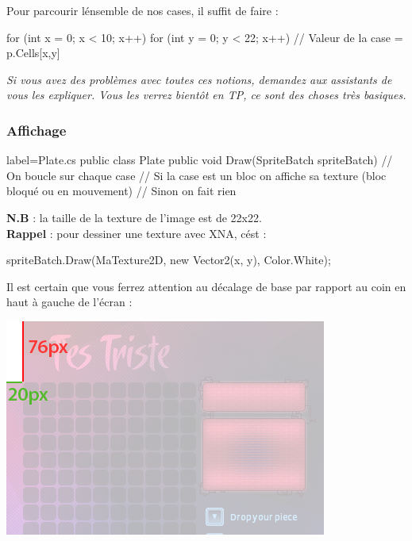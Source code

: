 \documentclass[a4paper]{article}
\begin{document}
\vspace{0.2cm}

Pour parcourir lénsemble de nos cases, il suffit de faire : \\

\begin{csharpcode}
for (int x = 0; x < 10; x++)
{
    for (int y = 0; y < 22; x++)
    {
        // Valeur de la case =  p.Cells[x,y]
    }
}
\end{csharpcode}

\vspace{0.2cm}

\noindent\emph{\color{toogyblue} Si vous avez des problèmes avec toutes ces notions,
demandez aux assistants de vous les expliquer. Vous les verrez bientôt en TP,
ce sont des choses très basiques.} \\

\subsubsection{Affichage}

\begin{csharpcode*}{label=Plate.cs}
public class Plate
{
    public void Draw(SpriteBatch spriteBatch)
    {
        // On boucle sur chaque case
        // Si la case est un bloc on affiche sa texture (bloc bloqué ou en mouvement)
        // Sinon on fait rien
    }
}
\end{csharpcode*}

\vspace{0.2cm}

\noindent\textbf{N.B} : la taille de la texture de l'image est de 22x22. \\

\textbf{Rappel} : pour dessiner une texture avec XNA, cést : \\

\begin{csharpcode}
spriteBatch.Draw(MaTexture2D, new Vector2(x, y), Color.White);
\end{csharpcode}

\vspace{0.2cm}

Il est certain que vous ferrez attention au décalage de base par rapport au
coin en haut à gauche de l'écran : \\

\begin{center}
    \includegraphics[scale=0.5]{img/decalage.png}
\end{center}
\end{document}
